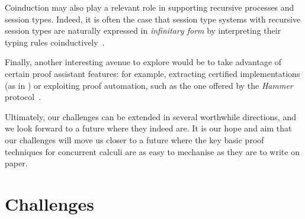 \documentclass[runningheads]{llncs}
\begin{document}
Coinduction may also play a relevant role in supporting recursive processes and session types.
Indeed, it is often the case that session type systems with recursive session types are naturally expressed in \emph{infinitary form} by interpreting their typing rules
coinductively~\cite{DerakhshanPfenning22,HornePadovani23}.

Finally, another interesting avenue to explore would be to take
advantage of certain proof assistant features: for example, extracting
certified implementations (as in \cite{Castro-Perez2021}) or exploiting
proof automation, such as the one offered by the \emph{Hammer}
protocol~\cite{BohmeN10,CzajkaK18}.

Ultimately, our challenges can be extended in several worthwhile directions, and we look forward to a future where they indeed are.
It is our hope and aim that our challenges will move us closer to a future where the key basic proof techniques for concurrent calculi are as easy to mechanise as they are to write on paper.




\clearpage
\appendix
\section{Challenges}\label{app:challenges}

\end{document}

